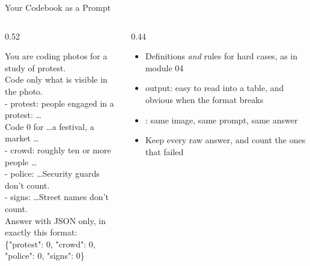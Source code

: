 \begin{frame}[fragile]{Your Codebook as a Prompt}
\begin{columns}[T]
\begin{column}{0.52\textwidth}
\begin{codebox}
{\scriptsize\ttfamily
You are coding photos for a study of protest.\\
Code only what is visible in the photo.\\[3pt]
- protest: people engaged in a protest: \ldots\\
\hspace*{1em}Code 0 for \ldots a festival, a market \ldots\\
- crowd: roughly ten or more people \ldots\\
- police: \ldots Security guards don't count.\\
- signs: \ldots Street names don't count.\\[3pt]
Answer with JSON only, in exactly this format:\\
\{"protest": 0, "crowd": 0, "police": 0, "signs": 0\}}
\end{codebox}
\end{column}
\begin{column}{0.44\textwidth}
\begin{itemize}
\item Definitions \emph{and} rules for hard cases, as in module 04
\item {} output: easy to read into a table, and obvious when the format breaks
\item {}: same image, same prompt, same answer
\item Keep every raw answer, and count the ones that failed
\end{itemize}
\end{column}
\end{columns}
\end{frame}

